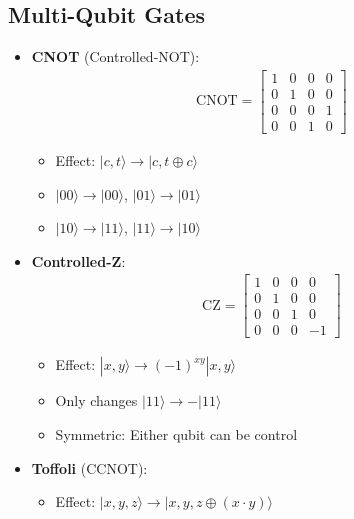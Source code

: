\begin{multicols}{3}
    \section*{Multi-Qubit Gates}
    \begin{itemize}[leftmargin=*,nosep,topsep=0pt]
      \item \textbf{CNOT} (Controlled-NOT):
        \begin{align*}
          \text{CNOT} = \begin{bmatrix}
            1 & 0 & 0 & 0 \\
            0 & 1 & 0 & 0 \\
            0 & 0 & 0 & 1 \\
            0 & 0 & 1 & 0
          \end{bmatrix}
        \end{align*}
        \begin{itemize}[nosep]
          \item Effect: $|c,t\rangle \rightarrow |c, t \oplus c\rangle$
          \item $|00\rangle \to |00\rangle$, $|01\rangle \to |01\rangle$
          \item $|10\rangle \to |11\rangle$, $|11\rangle \to |10\rangle$
        \end{itemize}
      \item \textbf{Controlled-Z}:
        \begin{align*}
          \text{CZ} = \begin{bmatrix}
            1 & 0 & 0 & 0 \\
            0 & 1 & 0 & 0 \\
            0 & 0 & 1 & 0 \\
            0 & 0 & 0 & -1
          \end{bmatrix}
        \end{align*}
        \begin{itemize}[nosep]
          \item Effect: $|x,y\rangle \to (-1)^{xy}|x,y\rangle$
          \item Only changes $|11\rangle \to -|11\rangle$
          \item Symmetric: Either qubit can be control
        \end{itemize}
      \item \textbf{Toffoli} (CCNOT):
        \begin{itemize}[nosep]
          \item Effect: $|x,y,z\rangle \to |x,y,z \oplus (x \cdot y)\rangle$

\end{itemize}
\end{itemize}
\end{multicols}
